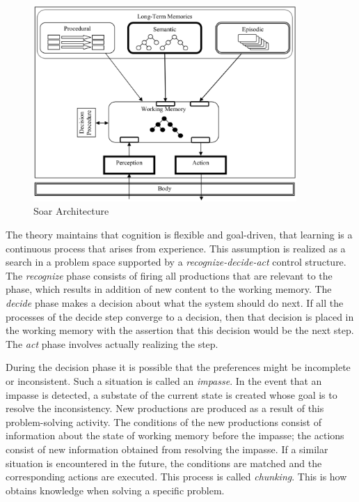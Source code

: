 \begin{figure}[htp]
  \centering
  \includegraphics[width=100mm]{soar}
  \caption{Soar Architecture\cite{Jill-Fain-Lehman:2006aa}}
  \label{SOAR_ARCH}
\end{figure}

The \soar theory maintains that cognition is flexible and goal-driven,
that learning is a continuous process that arises from experience. This assumption
is realized as a search in a problem space supported by a
\emph{recognize-decide-act} control structure\cite{Lewis:2001aa}. The
{\em recognize} phase consists of firing all productions that are relevant
to the phase, which results in addition of new content to the working
memory. The {\em decide} phase makes a decision about what the system should
do next. If all the processes of the decide step converge to a
decision, then that decision is placed in the working memory with the
assertion that this decision would be the next step. The {\em act} phase
involves actually realizing the step. 
 
During the decision phase it is possible that the
preferences might be incomplete or inconsistent. Such a situation is
called an \emph{impasse}. In the event that an impasse is detected, a
substate of the current state is created whose goal is to resolve the
inconsistency. New productions are produced as a result of this
problem-solving activity. The conditions of the new productions
consist of information about the state of working memory before the
impasse; the actions consist of  new information obtained from
resolving the impasse. If a similar situation is encountered in the
future, the conditions are matched and the corresponding actions are
executed.  This process is called \emph{chunking}.  This is how
\soar obtains knowledge when solving a specific problem.


